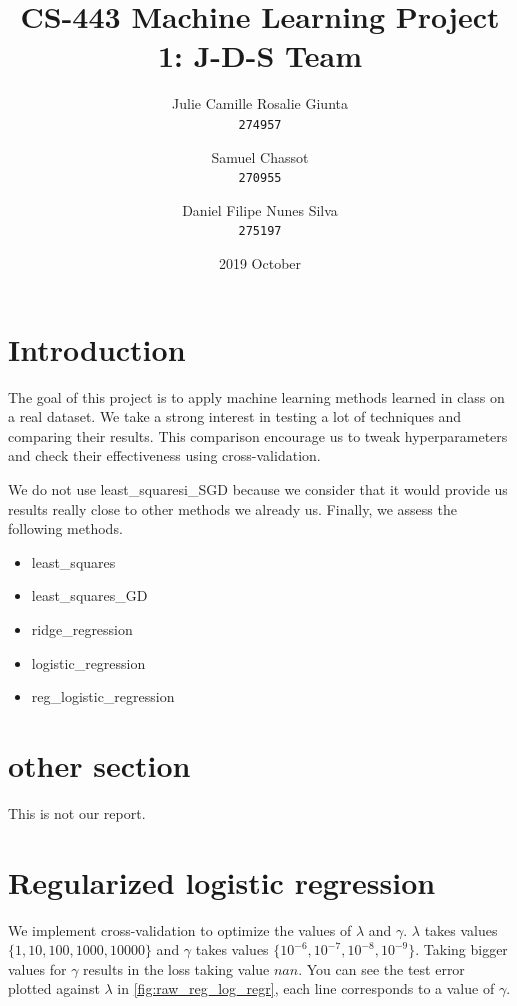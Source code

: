 \documentclass[11pt, a4paper, twoside]{article}
\begin{document}
\date{2019 October}
\title{CS-443 Machine Learning Project 1: J-D-S Team}
\author{
  Julie Camille Rosalie Giunta\\
  \texttt{274957}
  \and
  Samuel Chassot\\
  \texttt{270955}
  \and
  Daniel Filipe Nunes Silva\\
  \texttt{275197}
}

\maketitle
\clearpage

\section{Introduction}
The goal of this project is to apply machine learning
methods learned in class on a real dataset. We take a
strong interest in testing a lot of techniques and
comparing their results. This comparison encourage us to
tweak hyperparameters and check their effectiveness using
cross-validation.

We do not use least\_squaresi\_SGD because we consider
that it would provide us results really close to other
methods we already us. Finally, we assess the following
methods.

\begin{itemize}
  \item least\_squares
  \item least\_squares\_GD 
  \item ridge\_regression
  \item logistic\_regression
  \item reg\_logistic\_regression
\end{itemize}
 
\section{other section}
This is not our report.



\section{Regularized logistic regression}
We implement cross-validation to optimize the values of $\lambda$ and $\gamma$. 
$\lambda$ takes values $\{1,10,100,1000,10000\}$ and $\gamma$ takes values $\{10^{-6},10^{-7},10^{-8},10^{-9}\}$. 
Taking bigger values for $\gamma$ results in the loss taking value $nan$. 
You can see the test error plotted against $\lambda$ in \ref{fig:raw_reg_log_regr}, 
each line corresponds to a value of $\gamma$.
\end{document}
